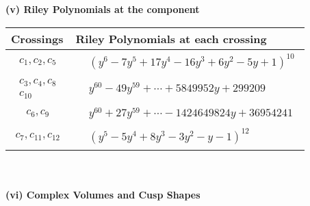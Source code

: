 \documentclass[1p]{elsarticle_modified}
\theoremstyle{definition}
\begin{document}
\newpage\renewcommand{\arraystretch}{1}
\flushleft \textbf{(v) Riley Polynomials at the component}\newline \\
\begin{tabular}{m{50pt}|m{274pt}}
Crossings & \hspace{64pt}Riley Polynomials at each crossing \\
\hline $$\begin{aligned}c_{1},c_{2},c_{5}\end{aligned}$$&$\begin{aligned}
&(y^6-7 y^5+17 y^4-16 y^3+6 y^2-5 y+1)^{10}
\end{aligned}$\\
\hline $$\begin{aligned}c_{3},c_{4},c_{8}\\c_{10}\end{aligned}$$&$\begin{aligned}
&y^{60}-49 y^{59}+\cdots+5849952 y+299209
\end{aligned}$\\
\hline $$\begin{aligned}c_{6},c_{9}\end{aligned}$$&$\begin{aligned}
&y^{60}+27 y^{59}+\cdots-1424649824 y+36954241
\end{aligned}$\\
\hline $$\begin{aligned}c_{7},c_{11},c_{12}\end{aligned}$$&$\begin{aligned}
&(y^5-5 y^4+8 y^3-3 y^2- y-1)^{12}
\end{aligned}$\\
\hline
\end{tabular}\\~\\
\newpage\flushleft \textbf{(vi) Complex Volumes and Cusp Shapes}
\end{document}
